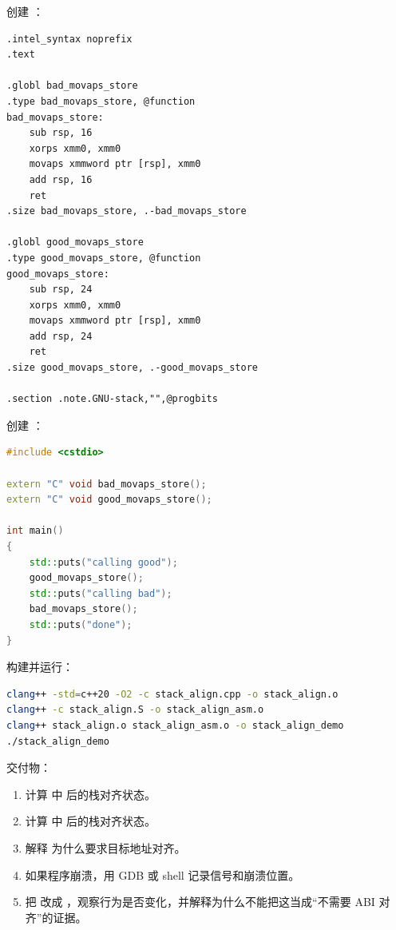 \begin{labbox}
创建 ：

\begin{lstlisting}
.intel_syntax noprefix
.text

.globl bad_movaps_store
.type bad_movaps_store, @function
bad_movaps_store:
    sub rsp, 16
    xorps xmm0, xmm0
    movaps xmmword ptr [rsp], xmm0
    add rsp, 16
    ret
.size bad_movaps_store, .-bad_movaps_store

.globl good_movaps_store
.type good_movaps_store, @function
good_movaps_store:
    sub rsp, 24
    xorps xmm0, xmm0
    movaps xmmword ptr [rsp], xmm0
    add rsp, 24
    ret
.size good_movaps_store, .-good_movaps_store

.section .note.GNU-stack,"",@progbits
\end{lstlisting}

创建 ：

\begin{lstlisting}[language=C++]
#include <cstdio>

extern "C" void bad_movaps_store();
extern "C" void good_movaps_store();

int main()
{
    std::puts("calling good");
    good_movaps_store();
    std::puts("calling bad");
    bad_movaps_store();
    std::puts("done");
}
\end{lstlisting}

构建并运行：

\begin{lstlisting}[language=bash]
clang++ -std=c++20 -O2 -c stack_align.cpp -o stack_align.o
clang++ -c stack_align.S -o stack_align_asm.o
clang++ stack_align.o stack_align_asm.o -o stack_align_demo
./stack_align_demo
\end{lstlisting}

交付物：

\begin{enumerate}
  \item 计算  中  后的栈对齐状态。
  \item 计算  中  后的栈对齐状态。
  \item 解释  为什么要求目标地址对齐。
  \item 如果程序崩溃，用 GDB 或 shell 记录信号和崩溃位置。
  \item 把  改成 ，观察行为是否变化，并解释为什么不能把这当成“不需要 ABI 对齐”的证据。
\end{enumerate}
\end{labbox}


